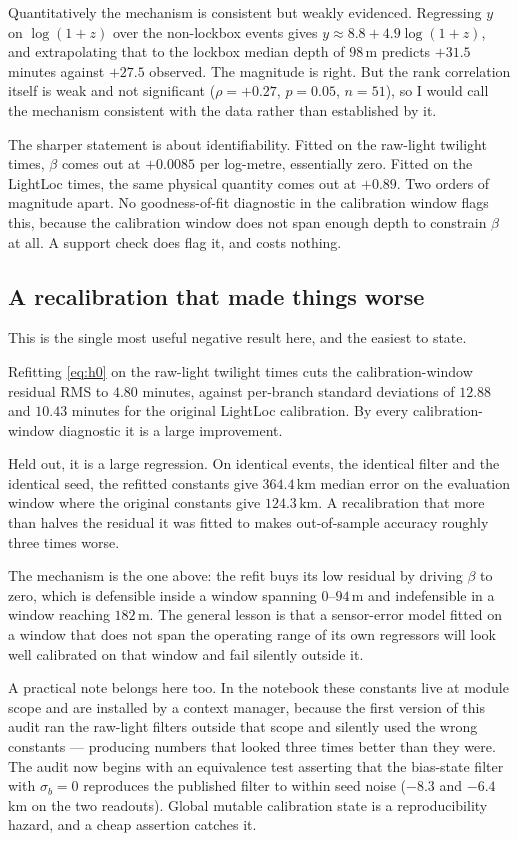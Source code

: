 \documentclass[conference]{IEEEtran}
\begin{document}
Quantitatively the mechanism is consistent but weakly evidenced. Regressing
$y$ on $\log(1+z)$ over the non-lockbox events gives
$y \approx 8.8 + 4.9\log(1+z)$, and extrapolating that to the lockbox median
depth of $98$\,\si{\m} predicts $+31.5$ minutes against $+27.5$ observed. The
magnitude is right. But the rank correlation itself is weak and not significant
($\rho=+0.27$, $p=0.05$, $n=51$), so I would call the mechanism consistent with
the data rather than established by it.

The sharper statement is about identifiability. Fitted on the raw-light twilight
times, $\beta$ comes out at $+0.0085$ per log-metre, essentially zero. Fitted on
the LightLoc times, the same physical quantity comes out at $+0.89$. Two orders
of magnitude apart. No goodness-of-fit diagnostic in the calibration window
flags this, because the calibration window does not span enough depth to
constrain $\beta$ at all. A support check does flag it, and costs nothing.

\subsection{A recalibration that made things worse}
\label{sec:recal}
This is the single most useful negative result here, and the easiest to state.

Refitting \eqref{eq:h0} on the raw-light twilight times cuts the
calibration-window residual RMS to $4.80$ minutes, against per-branch standard
deviations of $12.88$ and $10.43$ minutes for the original LightLoc calibration.
By every calibration-window diagnostic it is a large improvement.

Held out, it is a large regression. On identical events, the identical filter and
the identical seed, the refitted constants give $364.4$\,\si{\km} median error on
the evaluation window where the original constants give $124.3$\,\si{\km}. A
recalibration that more than halves the residual it was fitted to makes
out-of-sample accuracy roughly three times worse.

The mechanism is the one above: the refit buys its low residual by driving
$\beta$ to zero, which is defensible inside a window spanning $0$--$94$\,\si{\m}
and indefensible in a window reaching $182$\,\si{\m}. The general lesson is that
a sensor-error model fitted on a window that does not span the operating range of
its own regressors will look well calibrated on that window and fail silently
outside it.

A practical note belongs here too. In the notebook these constants live at module
scope and are installed by a context manager, because the first version of this
audit ran the raw-light filters outside that scope and silently used the wrong
constants --- producing numbers that looked three times better than they were.
The audit now begins with an equivalence test asserting that the bias-state
filter with $\sigma_b=0$ reproduces the published filter to within seed noise
($-8.3$ and $-6.4$\,\si{\km} on the two readouts). Global mutable calibration
state is a reproducibility hazard, and a cheap assertion catches it.
\end{document}
